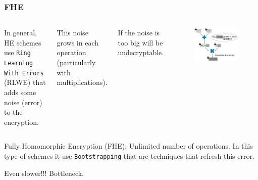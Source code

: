\documentclass[10pt,handout]{beamer}
\begin{document}



\begin{frame}
    \frametitle{FHE}
  \begin{columns}
      In general, HE schemes use \texttt{Ring Learning With Errors} (RLWE) that
      adds some noise (error) to the encryption.

\vspace{0.3cm}
    This noise grows in each operation (particularly with multiplications).

\vspace{0.3cm}
      If the noise is too big will be undecryptable.
        \begin{figure}[h!]
            \centering
            \includegraphics[scale=0.2]{multNoise.jpg}
        \end{figure}



\end{columns}

    Fully Homomorphic Encryption (FHE): Unlimited number of operations. In this type of schemes
    it use \texttt{Bootstrapping} that are techniques that refresh this error.

    Even slower!!! Bottleneck.

\end{frame}

\end{document}
